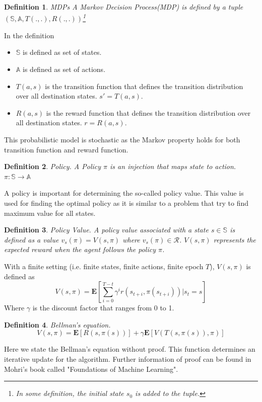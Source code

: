 \documentclass{article}
\newtheorem{mydef}{Definition}
\begin{document}
\begin{mydef}
MDPs
A Markov Decision Process(MDP) is defined by a tuple $(\mathbb{S},\mathbb{A},T(.,.),R(.,.))$\footnote{In some definition, the initial state $s_0$ is added to the tuple.}
\end{mydef}
In the definition
\begin{itemize}
\item $\mathbb{S}$ is defined as set of states.
\item $\mathbb{A}$ is defined as set of actions.
\item $T(a,s)$ is the transition function that defines the transition distribution over all destination states. $s' = T(a,s)$.
\item $R(a,s)$ is the reward function that defines the transition distribution over all destination states. $r = R(a,s)$.
\end{itemize}
This probabilistic model is stochastic as the Markov property holds for both transition function and reward function.
\begin{mydef}
\textit{Policy}.
A Policy $\pi$ is an injection that maps state to action. $\pi:\mathbb{S}\rightarrow\mathbb{A}$
\end{mydef}
A policy is important for determining the so-called policy value. This value is used for finding the optimal policy as it is similar to a problem that try to find maximum value for all states.
\begin{mydef}
\textit{Policy Value}.
A policy value associated with a state $s \in \mathbb{S}$ is defined as a value $v_s(\pi) = V(s,\pi)$  where $v_s(\pi)  \in \mathcal{R}$. $V(s,\pi)$ represents the expected reward when the agent follows the policy $\pi$.
\end{mydef}
With a finite setting (i.e. finite states, finite actions, finite epoch $T$), $V(s,\pi)$  is defined as 
\begin{equation}
V(s,\pi) = \mathbf{E}\left[\sum_{i=0}^{T-t}\gamma^i r(s_{t+i},\pi(s_{t+i}))|s_t = s\right]
\end{equation}
Where $\gamma$ is the discount factor that ranges from 0 to 1.
\begin{mydef}
\textit{Bellman's equation}.
\begin{equation}
V(s,\pi) = \mathbf{E}\left[ R(s,\pi(s)) \right]+ \gamma \mathbf{E}\left[V(T(s,\pi(s)),\pi)\right]
\end{equation}\label{bellman}
\end{mydef}
Here we state the Bellman's equation without proof. This function determines an iterative update for the algorithm. Further information of proof can be found in Mohri's book called "Foundations of Machine Learning"\cite{mohri2012foundations}.
\end{document}
